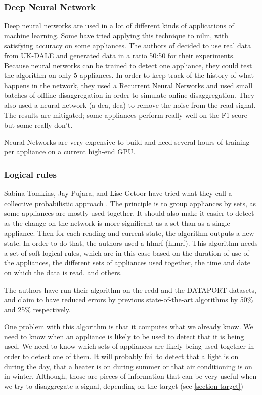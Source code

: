\subsubsection{Deep Neural Network}
Deep neural networks are used in a lot of different kinds of applications of machine learning. Some have tried applying this technique to \acrshort{nilm}, with satisfying accuracy on some appliances. The authors of \cite{kelly2015neural} decided to use real data from UK-DALE and generated data in a ratio 50:50 for their experiments. Because neural networks can be trained to detect one appliance, they could test the algorithm on only 5 appliances. In order to keep track of the history of what happens in the network, they used a Recurrent Neural Networks and used small batches of offline disaggregation in order to simulate online disaggregation. They also used a neural network (a \acrlong{dea}, \acrshort{dea}) to remove the noise from the read signal. The results are mitigated; some appliances perform really well on the F1 score but some really don't.

Neural Networks are very expensive to build and need several hours of training per appliance on a current high-end GPU.



\subsubsection{Logical rules}
Sabina Tomkins, Jay Pujara, and Lise Getoor have tried what they call a collective probabilistic approach \cite{tomkins2017disambiguating}. The principle is to group appliances by sets, as some appliances are mostly used together. It should also make it easier to detect as the change on the network is more significant as a set than as a single appliance. Then for each reading and current state, the algorithm outputs a new state. In order to do that, the authors used a \acrlong{hlmrf} (\acrshort{hlmrf})\cite{bach2015hinge}. This algorithm needs a set of soft logical rules, which are in this case based on the duration of use of the appliances, the different sets of appliances used together, the time and date on which the data is read, and others.

The authors have run their algorithm on the \acrshort{redd} and the DATAPORT datasets, and claim to have reduced errors by previous state-of-the-art algorithms by 50\% and 25\% respectively.

One problem with this algorithm is that it computes what we already know. We need to know when an appliance is likely to be used to detect that it is being used. We need to know which sets of appliances are likely being used together in order to detect one of them. It will probably fail to detect that a light is on during the day, that a heater is on during summer or that air conditioning is on in winter. Although, those are pieces of information that can be very useful when we try to disaggregate a signal, depending on the target (see \autoref{section-target})


